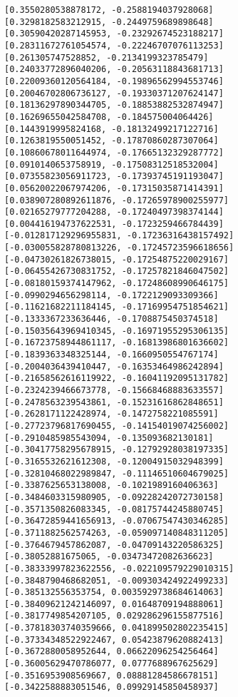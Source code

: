 \documentclass[12pt,a4paper]{article}
\begin{document}
\begin{lstlisting}
[0.3550280538878172, -0.2588194037928068]
[0.3298182583212915, -0.2449759689898648]
[0.30590420287145953, -0.23292674523188217]
[0.28311672761054574, -0.22246707076113253]
[0.261305747528852, -0.2134199323785479]
[0.24033772896040206, -0.20563118843681713]
[0.22009360120564184, -0.19896562994553746]
[0.20046702806736127, -0.19330371207624147]
[0.18136297890344705, -0.18853882532874947]
[0.16269655042584708, -0.184575004064426]
[0.1443919995824168, -0.18132499217122716]
[0.1263819550051452, -0.17870860287307064]
[0.10860678011644974, -0.17665132329287772]
[0.0910140653758919, -0.17508312518532004]
[0.07355823056911723, -0.17393745191193047]
[0.05620022067974206, -0.17315035871414391]
[0.038907280892611876, -0.17265978900255977]
[0.02165279777204288, -0.17240497398374144]
[0.004416194737622531, -0.1723259466784439]
[-0.012817129296955831, -0.17236316438157492]
[-0.030055828780813226, -0.17245723596618656]
[-0.04730261826738015, -0.17254875220029167]
[-0.06455426730831752, -0.17257821846047502]
[-0.08180159374147962, -0.17248608990646175]
[-0.0990294656298114, -0.1722129093309366]
[-0.11621682211184145, -0.17169954751854621]
[-0.1333367233636446, -0.1708875450374518]
[-0.15035643969410345, -0.16971955295306135]
[-0.16723758944861117, -0.16813986801636602]
[-0.1839363348325144, -0.1660950554767174]
[-0.2004036439410447, -0.16353464986242894]
[-0.21658562616119922, -0.16041192095131782]
[-0.2324239466673778, -0.15668468883633557]
[-0.2478563239543861, -0.15231616862848651]
[-0.2628171122428974, -0.1472758221085591]
[-0.27723796817690455, -0.14154019074256002]
[-0.2910485985543094, -0.135093682130181]
[-0.30417758295678915, -0.12792928038197335]
[-0.3165532621612308, -0.12004915032948399]
[-0.32810468022989847, -0.11146510604679025]
[-0.3387625653138008, -0.1021989160406363]
[-0.3484603315980905, -0.09228242072730158]
[-0.3571350826083345, -0.08175744245880745]
[-0.36472859441656913, -0.07067547430346285]
[-0.3711882562574263, -0.059097140848311205]
[-0.3764679457862087, -0.04709143220586325]
[-0.38052881675065, -0.03473472082636623]
[-0.38333997823622556, -0.022109579229010315]
[-0.3848790468682051, -0.009303424922499233]
[-0.385132556353754, 0.0035929738684614063]
[-0.38409621242146097, 0.01648709194888061]
[-0.3817749854207105, 0.029286296155877516]
[-0.37818303740359666, 0.041899502802235415]
[-0.37334348522922467, 0.05423879620882413]
[-0.3672880058952644, 0.06622096254256464]
[-0.36005629470786077, 0.0777688967625629]
[-0.3516953908569667, 0.08881284586678151]
[-0.3422588883051546, 0.09929145850458937]

\end{lstlisting}
\end{document}

